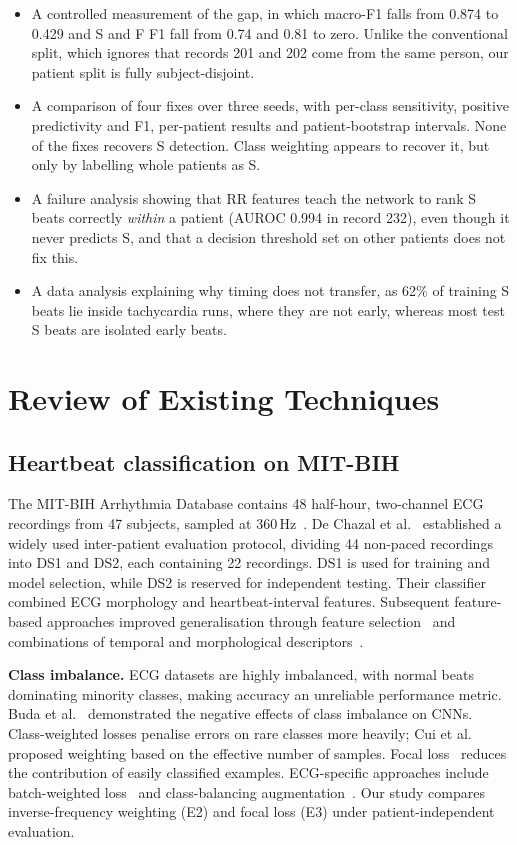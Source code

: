 \documentclass[10pt,a4paper]{article}
\begin{document}
{\begin{itemize}
\item A controlled measurement of the gap, in which macro-F1 falls from 0.874 to 0.429 and S and F F1 fall from 0.74 and 0.81 to zero. Unlike the conventional split, which ignores that records 201 and 202 come from the same person, our patient split is fully subject-disjoint.
\item A comparison of four fixes over three seeds, with per-class sensitivity, positive predictivity and F1, per-patient results and patient-bootstrap intervals. None of the fixes recovers S detection. Class weighting appears to recover it, but only by labelling whole patients as S.
\item A failure analysis showing that RR features teach the network to rank S beats correctly \emph{within} a patient (AUROC 0.994 in record 232), even though it never predicts S, and that a decision threshold set on other patients does not fix this.
\item A data analysis explaining why timing does not transfer, as 62\% of training S beats lie inside tachycardia runs, where they are not early, whereas most test S beats are isolated early beats.
\end{itemize}\par}

\section{Review of Existing Techniques}


\subsection{Heartbeat classification on MIT-BIH}

The MIT-BIH Arrhythmia Database contains 48 half-hour, two-channel ECG recordings from 47 subjects, sampled at 360\,Hz~\cite{moody2005mitbih}. De Chazal et al.~\cite{dechazal2004automatic} established a widely
used inter-patient evaluation protocol, dividing 44 non-paced recordings into DS1 and DS2, each containing 22 recordings. DS1 is used for training and model selection, while DS2 is reserved for independent testing. Their classifier combined ECG morphology and heartbeat-interval features. Subsequent feature-based approaches improved generalisation through feature selection~\cite{Llamedo2011} and combinations of temporal and morphological descriptors~\cite{MondejarGuerra2019}.

\textbf{Class imbalance.}
ECG datasets are highly imbalanced, with normal beats dominating minority classes, making accuracy an unreliable performance metric. Buda et al.~\cite{Buda2018} demonstrated the negative effects of class imbalance on CNNs. Class-weighted losses penalise errors on rare classes more heavily; Cui et al.~\cite{Cui2019} proposed weighting based on the effective number of samples. Focal loss~\cite{Lin2017} reduces the
contribution of easily classified examples. ECG-specific approaches include batch-weighted loss~\cite{Sellami2019} and class-balancing augmentation~\cite{Acharya2017}. Our study compares inverse-frequency weighting (E2) and focal loss (E3) under patient-independent evaluation.
\end{document}
